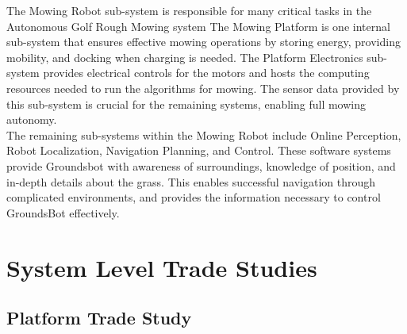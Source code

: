 \documentclass[12pt]{extarticle}
\begin{document}
  The Mowing Robot sub-system is responsible for many critical tasks in the Autonomous Golf Rough Mowing system The Mowing Platform is one internal sub-system that ensures effective mowing operations by storing energy, providing mobility, and docking when charging is needed. The Platform Electronics sub-system provides electrical controls for the motors and hosts the computing resources needed to run the algorithms for mowing. The sensor data provided by this sub-system is crucial for the remaining systems, enabling full mowing autonomy.\\
  
  The remaining sub-systems within the Mowing Robot include Online Perception, Robot Localization, Navigation Planning, and Control. These software systems provide Groundsbot with awareness of surroundings, knowledge of position, and in-depth details about the grass. This enables successful navigation through complicated environments, and provides the information necessary to control GroundsBot effectively.\\

\newpage
\section{System Level Trade Studies}
	\subsection{Platform Trade Study}
\end{document}
